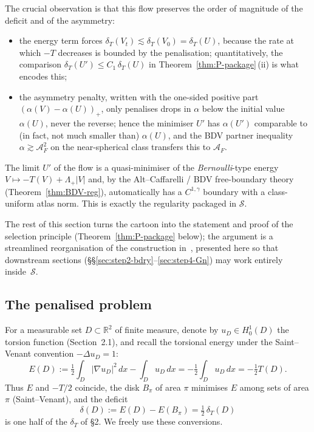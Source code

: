 \documentclass[11pt]{amsart}
\newcommand{\R}{\mathbb R}
\newcommand{\dT}{\delta_T}
\newcommand{\AF}{\mathcal A_F}
\newcommand{\Sclass}{\mathcal S}
\begin{document}
The crucial observation is that this flow preserves the order of
magnitude of the deficit and of the asymmetry:
\begin{itemize}[leftmargin=2em]
\item the energy term forces $\dT(V_{t})\lesssim\dT(V_{0})=\dT(U)$,
because the rate at which $-T$ decreases is bounded by the
penalisation; quantitatively, the comparison
$\dT(U')\le C_1\,\dT(U)$ in
Theorem~\ref{thm:P-package}\,(ii) is what encodes this;
\item the asymmetry penalty, written with the one-sided positive
part $(\alpha(V)-\alpha(U))_{+}$, only penalises drops in $\alpha$
below the initial value $\alpha(U)$, never the reverse; hence the
minimiser $U'$ has $\alpha(U')$ comparable to (in fact, not much
smaller than) $\alpha(U)$, and the BDV partner inequality
$\alpha\gtrsim\AF^{2}$ on the near-spherical class transfers this to
$\AF$.
\end{itemize}
The limit $U'$ of the flow is a quasi-minimiser of the
\emph{Bernoulli}-type energy $V\mapsto -T(V)+\Lambda_{+}|V|$ and, by
the Alt--Caffarelli / BDV free-boundary theory
(Theorem~\ref{thm:BDV-reg}), automatically has a $C^{1,\gamma}$
boundary with a class-uniform atlas norm.  This is exactly the
regularity packaged in $\Sclass$.

The rest of this section turns the cartoon into the statement and
proof of the selection principle (Theorem~\ref{thm:P-package}
below); the argument is a streamlined reorganisation of the
construction in~\cite[\S4]{BDV2015}, presented here so that
downstream sections (\S\S\ref{sec:step2-bdry}--\ref{sec:step4-Gn})
may work entirely inside~$\Sclass$.

\subsection{The penalised problem}\label{ss:penalised}

For a measurable set \(D\subset\R^2\) of finite measure, denote by
\(u_D\in H^1_0(D)\) the torsion function (Section~2.1), and recall the
torsional energy under the Saint--Venant convention
\(-\Delta u_D=1\):
\[
   E(D):=\tfrac12\int_D|\nabla u_D|^2\,dx-\int_D u_D\,dx
         =-\tfrac12\int_D u_D\,dx
         =-\tfrac12 T(D).
\]
Thus \(E\) and \(-T/2\) coincide, the disk \(B_\pi\) of area \(\pi\)
minimises \(E\) among sets of area \(\pi\) (Saint--Venant), and the
deficit
\[
   \delta(D):=E(D)-E(B_\pi)=\tfrac12\,\dT(D)
\]
is one half of the \(\dT\) of \S2.  We freely use these conversions.
\end{document}
